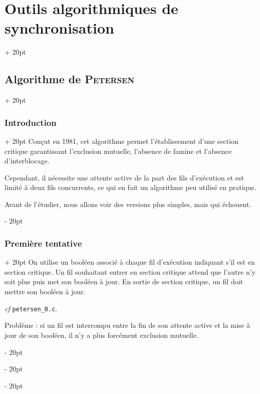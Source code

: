 \documentclass[a4paper, 12pt, twoside]{article}
\newcommand{\ind}[1][20pt]{\advance\leftskip + #1}
\newcommand{\deind}[1][20pt]{\advance\leftskip - #1}
\newenvironment{indt}[2][20pt]{#2 \par \ind[#1]}{\par \deind} %
\begin{document}
    \begin{indt}{\section{Outils algorithmiques de synchronisation}}
        \begin{indt}{\subsection{Algorithme de \textsc{Petersen}}}
            \begin{indt}{\subsubsection{Introduction}}
                Conçut en 1981, cet algorithme permet l'établissement d'une section critique garantissant l'exclusion mutuelle, l'absence de famine et l'absence d'interblocage.

                Cependant, il nécessite une attente active de la part des fils d'exécution et est limité à deux fils concurrents, ce qui en fait un algorithme peu utilisé en pratique.

                Avant de l'étudier, nous allons voir des versions plus simples, mais qui échouent.
            \end{indt}

            \vspace{12pt}
            
            \begin{indt}{\subsubsection{Première tentative}}
                On utilise un booléen associé à chaque fil d'exécution indiquant s'il est en section critique.
                Un fil souhaitant entrer en section critique attend que l'autre n'y soit plus puis met son booléen à jour.
                En sortie de section critique, un fil doit mettre son booléen à jour.

                \textit{cf} \texttt{petersen\_0.c}.

                \vspace{6pt}
                
                Problème : si un fil est interrompu entre la fin de son attente active et la mise à jour de son booléen, il n'y a plus forcément exclusion mutuelle.
            \end{indt}


\end{indt}
\end{indt}
\end{document}
